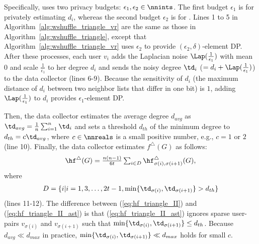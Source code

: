 Specifically, \AlgWSTriVR{} uses two privacy budgets: $\epsilon_1, \epsilon_2 \in \nnints$. 
The first budget $\epsilon_1$ is for privately estimating $d_i$, whereas the second budget $\epsilon_2$ is for 
\AlgWSLE{}. 
Lines 1 to 5 in Algorithm~\ref{alg:wshuffle_triangle_vr} are the same as those in Algorithm~\ref{alg:wshuffle_triangle}, except that Algorithm~\ref{alg:wshuffle_triangle_vr} uses $\epsilon_2$ 
to provide $(\epsilon_2, \delta)$-element DP. 
After these processes, each user $v_i$ adds the Laplacian noise $\Lap(\frac{1}{\epsilon_1})$ with mean $0$ and scale $\frac{1}{\epsilon_1}$ to her degree $d_i$ and sends the noisy degree $\td_i$ ($= d_i + \Lap(\frac{1}{\epsilon_1})$) to the data collector (lines 6-9). 
Because the sensitivity \cite{DP} of $d_i$ (the maximum distance of $d_i$ between two neighbor lists that differ in one bit) is $1$, adding $\Lap(\frac{1}{\epsilon_1})$ to $d_i$ provides $\epsilon_1$-element DP. 

Then, the data collector estimates the average degree $d_{avg}$ as $\td_{avg} = \frac{1}{n}\sum_{i=1}^n \td_i$ and sets a threshold $d_{th}$ of the minimum degree to $d_{th} = c \td_{avg}$, where $c \in \nnreals$ is a small positive number, e.g., $c=1$ or $2$ (line 10). 
Finally, the data collector estimates $f^\triangle(G)$ as follows: 
\begin{align}
    \hf^\triangle(G) = \textstyle{\frac{n(n-1)}{6t} \sum_{i \in D} \hf_{\sigma(i),\sigma(i+1)}^\triangle(G)}, 
   \label{eq:hf_triangle_II_ast}
\end{align}
where 
\begin{align*}
D = \{i | i = 1, 3, \ldots, 2t-1, 
  \min\{\td_{\sigma(i)}, \td_{\sigma(i+1)}\} > d_{th}\}
\end{align*}
(lines 11-12). 
The difference between (\ref{eq:hf_triangle_II}) and (\ref{eq:hf_triangle_II_ast}) is that (\ref{eq:hf_triangle_II_ast}) ignores sparse user-pairs $v_{\sigma(i)}$ and $v_{\sigma(i+1)}$ such that $\min\{\td_{\sigma(i)}, \td_{\sigma(i+1)}\} \leq d_{th}$. 
Because $d_{avg} \ll d_{max}$ in practice,  
$\min\{\td_{\sigma(i)}, \td_{\sigma(i+1)}\} \ll d_{max}$ holds for small $c$. 

